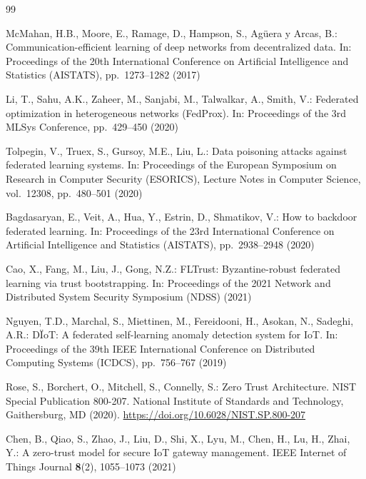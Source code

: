 \documentclass[iicol,Numbered]{sn-jnl}
\begin{document}
\begingroup\scriptsize
\setlength{\itemsep}{0pt}
\setlength{\parskip}{0pt}
\setlength{\parsep}{0pt}
\begin{thebibliography}{99}

McMahan, H.B., Moore, E., Ramage, D., Hampson, S., Ag{\"u}era y Arcas, B.:
Communication-efficient learning of deep networks from decentralized data.
In: Proceedings of the 20th International Conference on Artificial Intelligence
and Statistics (AISTATS), pp.\ 1273--1282 (2017)

Li, T., Sahu, A.K., Zaheer, M., Sanjabi, M., Talwalkar, A., Smith, V.:
Federated optimization in heterogeneous networks (FedProx).
In: Proceedings of the 3rd MLSys Conference, pp.\ 429--450 (2020)

Tolpegin, V., Truex, S., Gursoy, M.E., Liu, L.:
Data poisoning attacks against federated learning systems.
In: Proceedings of the European Symposium on Research in Computer Security
(ESORICS), Lecture Notes in Computer Science, vol.\ 12308, pp.\ 480--501 (2020)

Bagdasaryan, E., Veit, A., Hua, Y., Estrin, D., Shmatikov, V.:
How to backdoor federated learning.
In: Proceedings of the 23rd International Conference on Artificial Intelligence
and Statistics (AISTATS), pp.\ 2938--2948 (2020)

Cao, X., Fang, M., Liu, J., Gong, N.Z.:
FLTrust: Byzantine-robust federated learning via trust bootstrapping.
In: Proceedings of the 2021 Network and Distributed System Security Symposium
(NDSS) (2021)

Nguyen, T.D., Marchal, S., Miettinen, M., Fereidooni, H., Asokan, N.,
Sadeghi, A.R.:
D\"{I}oT: A federated self-learning anomaly detection system for IoT.
In: Proceedings of the 39th IEEE International Conference on Distributed
Computing Systems (ICDCS), pp.\ 756--767 (2019)

Rose, S., Borchert, O., Mitchell, S., Connelly, S.:
Zero Trust Architecture. NIST Special Publication 800-207.
National Institute of Standards and Technology, Gaithersburg, MD (2020).
\url{https://doi.org/10.6028/NIST.SP.800-207}

Chen, B., Qiao, S., Zhao, J., Liu, D., Shi, X., Lyu, M., Chen, H., Lu, H.,
Zhai, Y.:
A zero-trust model for secure IoT gateway management.
IEEE Internet of Things Journal \textbf{8}(2), 1055--1073 (2021)


\end{thebibliography}
\end{document}
